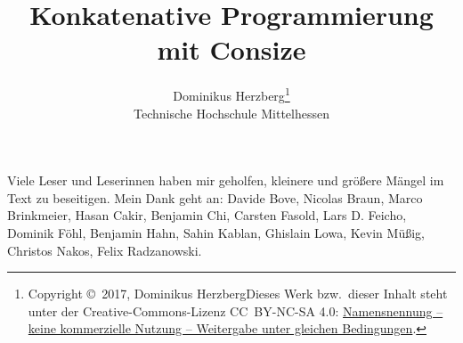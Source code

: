 \documentclass[a4paper]{refrep}
\theoremstyle{plain}
\begin{document}
\title{\bf Konkatenative Programmierung mit Consize}
\author{Dominikus Herzberg\thanks{%
Copyright \copyright\ 2017, Dominikus Herzberg\medskip\newline Dieses Werk bzw.\ dieser Inhalt steht unter der Creative-Commons-Lizenz CC~BY-NC-SA 4.0: \href{https://creativecommons.org/licenses/by-nc-sa/4.0/}{Namensnennung -- keine kommerzielle Nutzung -- Weitergabe unter gleichen Bedingungen}.}%
\\Technische Hochschule Mittelhessen}
\maketitle

Viele Leser und Leserinnen haben mir geholfen, kleinere und größere Mängel im Text zu beseitigen. Mein Dank geht an:
Davide Bove, %
Nicolas Braun, %
Marco Brinkmeier, %
Hasan Cakir, %
Benjamin Chi, %
Carsten Fasold, %
Lars D. Feicho, %
Dominik Föhl, %
Benjamin Hahn, %
Sahin Kablan, %
Ghislain Lowa, %
Kevin Müßig, %
Christos Nakos, %
Felix Radzanowski. %

\newpage

\tableofcontents











\appendix





%
%
\end{document}
